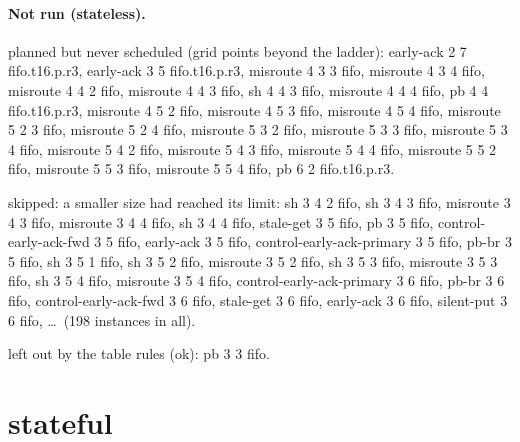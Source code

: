 \documentclass[10pt]{article}
\begin{document}
\paragraph{Not run (stateless).}
planned but never scheduled (grid points beyond the ladder): early-ack 2 7 fifo.t16.p.r3, early-ack 3 5 fifo.t16.p.r3, misroute 4 3 3 fifo, misroute 4 3 4 fifo, misroute 4 4 2 fifo, misroute 4 4 3 fifo, sh 4 4 3 fifo, misroute 4 4 4 fifo, pb 4 4 fifo.t16.p.r3, misroute 4 5 2 fifo, misroute 4 5 3 fifo, misroute 4 5 4 fifo, misroute 5 2 3 fifo, misroute 5 2 4 fifo, misroute 5 3 2 fifo, misroute 5 3 3 fifo, misroute 5 3 4 fifo, misroute 5 4 2 fifo, misroute 5 4 3 fifo, misroute 5 4 4 fifo, misroute 5 5 2 fifo, misroute 5 5 3 fifo, misroute 5 5 4 fifo, pb 6 2 fifo.t16.p.r3.\par
skipped: a smaller size had reached its limit: sh 3 4 2 fifo, sh 3 4 3 fifo, misroute 3 4 3 fifo, misroute 3 4 4 fifo, sh 3 4 4 fifo, stale-get 3 5 fifo, pb 3 5 fifo, control-early-ack-fwd 3 5 fifo, early-ack 3 5 fifo, control-early-ack-primary 3 5 fifo, pb-br 3 5 fifo, sh 3 5 1 fifo, sh 3 5 2 fifo, misroute 3 5 2 fifo, sh 3 5 3 fifo, misroute 3 5 3 fifo, sh 3 5 4 fifo, misroute 3 5 4 fifo, control-early-ack-primary 3 6 fifo, pb-br 3 6 fifo, control-early-ack-fwd 3 6 fifo, stale-get 3 6 fifo, early-ack 3 6 fifo, silent-put 3 6 fifo, \ldots\ (198 instances in all).\par
left out by the table rules (ok): pb 3 3 fifo.\par
\section*{stateful}
\end{document}
